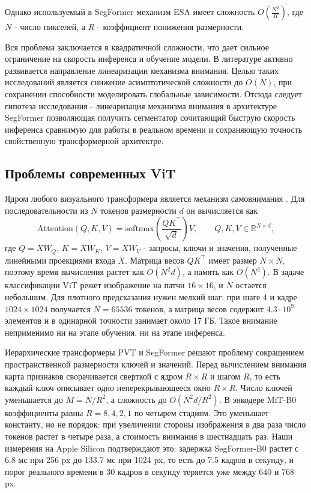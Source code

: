 \documentclass[a4paper,14pt]{article}
\numberwithin{figure}{section}
\numberwithin{table}{section}
\begin{document}
	Однако используемый в SegFormer механизм ESA имеет сложность $O(\frac{N^2}{R})$, где $N$ - число пикселей, а $R$ - коэффициент понижения размерности.

	Вся проблема заключается в квадратичной сложности, что дает сильное ограничение на скорость инференса и обучение модели.
	В литературе активно развивается направление линеаризации механизма внимания. Целью таких исследований является снижение асимптотической сложности до $O(N)$,
	при сохранении способности моделировать глобальные зависимости. Отсюда следует гипотеза исследования - линеаризация механизма внимания в архитектуре 
	SegFormer позволяющая получить сегментатор сочитающий быструю скорость инференса сравнимую для работы в реальном времени и сохраняющую точность свойственную трансформерной архитектре.


\subsection{Проблемы современных ViT}

	Ядром любого визуального трансформера является механизм самовнимания \cite{vaswani}. Для последовательности из $N$ токенов размерности $d$
	он вычисляется как
	$$
	\mathrm{Attention}(Q, K, V) = \mathrm{softmax}\left(\frac{QK^{\top}}{\sqrt{d}}\right) V, \qquad Q, K, V \in \mathbb{R}^{N \times d},
	$$
	где $Q = XW_Q$, $K = XW_K$, $V = XW_V$ - запросы, ключи и значения, полученные линейными проекциями входа $X$.
	Матрица весов $QK^{\top}$ имеет размер $N \times N$, поэтому время вычисления растет как $O(N^2 d)$, а память как $O(N^2)$.
	В задаче классификации ViT \cite{vit} режет изображение на патчи $16 \times 16$, и $N$ остается небольшим. Для плотного предсказания
	нужен мелкий шаг: при шаге 4 и кадре $1024 \times 1024$ получается $N = 65536$ токенов, а матрица весов содержит $4.3 \cdot 10^{9}$
	элементов и в одинарной точности занимает около 17 ГБ. Такое внимание неприменимо ни на этапе обучения, ни на этапе инференса.

	Иерархические трансформеры PVT \cite{pvt} и SegFormer \cite{segformer} решают проблему сокращением пространственной размерности ключей
	и значений. Перед вычислением внимания карта признаков сворачивается сверткой с ядром $R \times R$ и шагом $R$, то есть каждый ключ
	описывает одно неперекрывающееся окно $R \times R$. Число ключей уменьшается до $M = N / R^2$, а сложность до $O(N^2 d / R^2)$.
	В энкодере MiT-B0 коэффициенты равны $R = 8, 4, 2, 1$ по четырем стадиям. Это уменьшает константу, но не порядок: при увеличении стороны
	изображения в два раза число токенов растет в четыре раза, а стоимость внимания в шестнадцать раз. Наши измерения на Apple Silicon подтверждают
	это: задержка SegFormer-B0 растет с 6.8 мс при 256 px до 133.7 мс при 1024 px, то есть до 7.5 кадров в секунду, и порог реального времени в 30 кадров
	в секунду теряется уже между 640 и 768 px.
\end{document}
